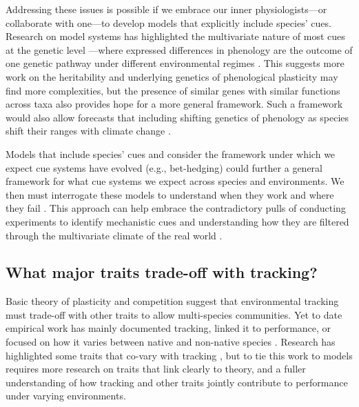 \documentclass[11pt,letterpaper]{article}
\newcommand{\R}[1]{\label{}\linelabel{#1}}
\begin{document}
\R{r2hertiable}Addressing these issues is possible if we embrace our inner physiologists---or collaborate with one---to develop models that explicitly include species' cues. Research on model systems has highlighted the multivariate nature of most cues at the genetic level \citep{Wilczek:2010ad}---where expressed differences in phenology are the outcome of one genetic pathway under different environmental regimes \citep{Stinchcombe:2004ec,Wilczek:2009oa,chang2021}. This suggests more work on the heritability and underlying genetics of phenological plasticity may find more complexities, but the presence of similar genes with similar functions across taxa \citep{Wilczek:2010ad,chang2021} also provides hope for a more general framework. Such a framework would also allow forecasts that including shifting genetics of phenology as species shift their ranges with climate change \citep[e.g.,][]{lusten2018}. \R{r2hertiableend}

Models that include species' cues and consider the framework under which we expect cue systems have evolved (e.g., bet-hedging) could further a general framework for what cue systems we expect across species and environments. We then must interrogate these models to understand when they work and where they fail \citep[see][for an example]{johanOCR}. This approach can help embrace the contradictory pulls of conducting experiments to identify mechanistic cues and understanding how they are filtered through the multivariate climate of the real world \citep[see][]{Wilczek:2010ad,Wilczek:2009oa}.


\subsection{What major traits trade-off with tracking?} 
Basic theory of plasticity and competition suggest that environmental tracking must trade-off with other traits to allow multi-species communities. Yet to date empirical work has mainly documented tracking, linked it to performance, or focused on how it varies between native and non-native species \citep{Willis:2010al,wolkovichAmBot2013,Zettlemoyer2019}. Research has highlighted some traits that co-vary with tracking \citep[e.g.,][]{kharouba2014,lasky2016,Zhu2016BioLetters}, but to tie this work to models requires more research on traits that link clearly to theory, and a fuller understanding of how tracking and other traits jointly contribute to performance under varying environments. 
\end{document}
